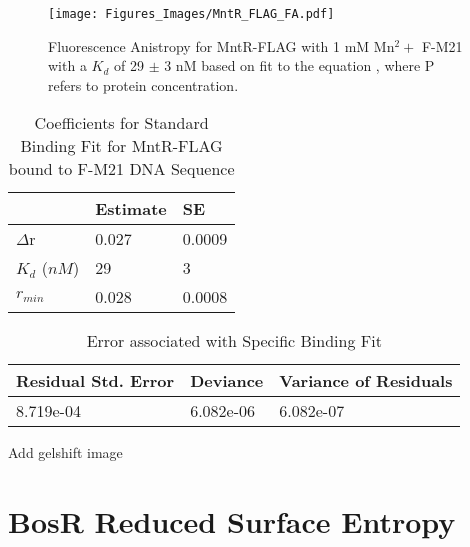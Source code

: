 \documentclass[12pt,twoside]{reedthesis}
\begin{document}
       	\begin{figure}[h!tbp]
       		\centering
       		\texttt{[image: Figures\_Images/MntR\_FLAG\_FA.pdf]}
       		\caption[Determining DNA Activity of MntR-FLAG by Fluorescence Anistropy]{Fluorescence Anistropy for MntR-FLAG with 1 mM Mn$^2+$ F-M21 with a $K_{d}$ of 29 $\pm$ 3 nM based on fit to the equation \FAstdfit , where P refers to protein concentration.}
       		\label{MntRFLAGFA}
       	\end{figure}
      
 \begin{table}[ht]
 	\caption{Coefficients for Standard Binding Fit for MntR-FLAG bound to F-M21 DNA Sequence} 
 	\label{MntRFLAGCoef}
 	\begin{tabularx}{3.0in}{|X|X|X|}
 		\hline
 		\textbf{ } & \textbf{Estimate} & \textbf{SE} \\ 
 		\hline
 		$\Delta$r & 0.027 & 0.0009 \\ 
 		\hline
 		$K_{d}$ ($nM$) &  29  &  3  \\ 
 		\hline
 		$r_{min}$ & 0.028 & 0.0008 \\ 
 		\hline
 	\end{tabularx}
 \end{table}
 
 \begin{table}[ht]
 \centering
 \parbox{5.0in}{\caption{Error associated with Specific Binding Fit}} 
 \begin{tabularx}{3.0in}{|X|X|X|}
 	\hline
 	\textbf{Residual Std. Error} & \textbf{Deviance} & \textbf{Variance of Residuals} \\ 
 	\hline
 	8.719e-04 & 6.082e-06 & 6.082e-07 \\ 
 	\hline
 \end{tabularx}
\end{table}


Add gelshift image 

\clearpage

   \section*{BosR Reduced Surface Entropy}
   
\end{document}

